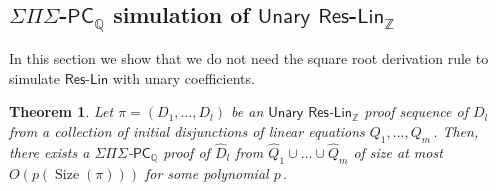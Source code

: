 \documentclass[11pt]{article}
\newtheorem{theorem}{Theorem}[section]
\newcommand{\Q}{{\mathbb Q}}
\newcommand{\Z}{{\mathbb Z}}
\DeclareMathOperator{\Size}{\mathrm{Size}}
\begin{document}
\subsection{\texorpdfstring{$\Sigma \Pi \Sigma$-$\mathsf{PC}_\Q$}{SignaPiSigma-PC-Q}
 simulation of \texorpdfstring{$\mathsf{Unary}$ $\mathsf{Res}$-$\mathsf{Lin}_\Z$}{Unary Res-Lin-Z}}
In this section we show that we do not need the square root derivation rule to simulate $\mathsf{Res}$-$\mathsf{Lin}$ with unary coefficients.

\begin{theorem}
\label{Res-Lin-u simulation}
%
Let $\pi = (D_1, \ldots, D_l)$ be an $\mathsf{Unary}$ $\mathsf{Res}$-$\mathsf{Lin}_\Z$ proof sequence of $D_l$ from a collection of initial disjunctions of linear equations %
$Q_1, \ldots, Q_m\,.$ %
 Then, there exists a $\Sigma \Pi \Sigma$-$\mathsf{PC}_{\Q}$ proof of $\widehat{D}_l$ from $\widehat{Q}_1 \cup \ldots \cup \widehat{Q}_m$ of size at most $O(p(\Size(\pi)))$ for some polynomial %
$p\,.$ %
%
\end{theorem}
\end{document}
